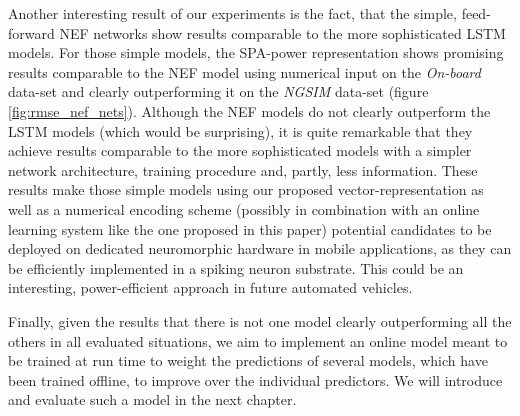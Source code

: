 Another interesting result of our experiments is the fact, that the simple, feed-forward \ac{NEF} networks show results comparable to the more sophisticated \ac{LSTM} models.
For those simple models, the \ac{SPA}-power representation shows promising results comparable to the \ac{NEF} model using numerical input on the \emph{On-board} data-set and clearly outperforming it on the \emph{\ac{NGSIM}} data-set (figure \ref{fig:rmse_nef_nets}).
Although the \ac{NEF} models do not clearly outperform the \ac{LSTM} models (which would be surprising), it is quite remarkable that they achieve results comparable to the more sophisticated models with a simpler network architecture, training procedure and, partly, less information.
These results make those simple models using our proposed vector-representation as well as a numerical encoding scheme (possibly in combination with an online learning system like the one proposed in this paper) potential candidates to be deployed on dedicated neuromorphic hardware in mobile applications, as they can be efficiently implemented in a spiking neuron substrate.
This could be an interesting, power-efficient approach in future automated vehicles.

Finally, given the results that there is not one model clearly outperforming all the others in all evaluated situations, we aim to implement an online model meant to be trained at run time to weight the predictions of several models, which have been trained offline, to improve over the individual predictors.
We will introduce and evaluate such a model in the next chapter.
